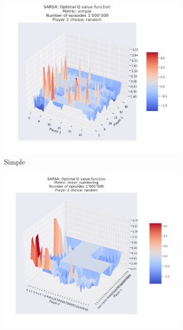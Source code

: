 \begin{figure}[ht!]
    \begin{subfigure}{0.5\textwidth}
        \includegraphics[width=1\linewidth]{Figures/SARSA_simple_1000000_random} 
        \caption[Simple]{Simple}
        \label{fig:SARSASimple}
    \end{subfigure}
    \begin{subfigure}{0.5\textwidth}
        \includegraphics[width=1\linewidth]{Figures/SARSA_linear_numbering_1000000_random}

\end{subfigure}
\end{figure}
